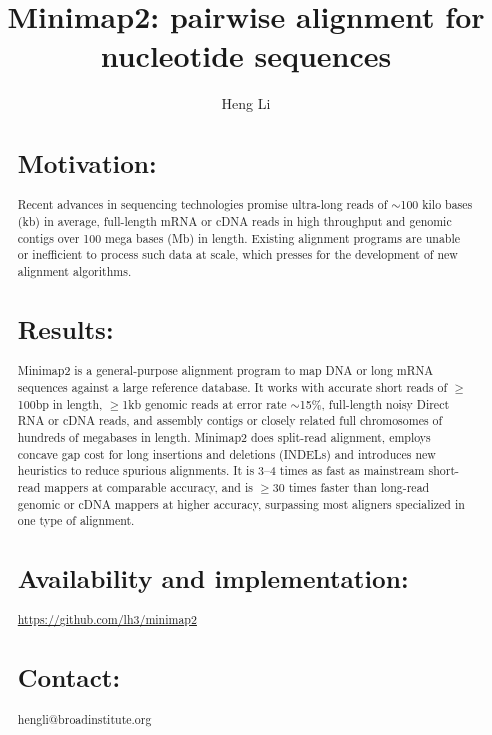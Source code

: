 \documentclass{bioinfo}
\begin{document}

\title[Aligning nucleotide sequences with minimap2]{Minimap2: pairwise alignment for nucleotide sequences}
\author[Li]{Heng Li}
\address{Broad Institute, 415 Main Street, Cambridge, MA 02142, USA}

\maketitle

\begin{abstract}

\section{Motivation:} Recent advances in sequencing technologies promise
ultra-long reads of $\sim$100 kilo bases (kb) in average, full-length mRNA or
cDNA reads in high throughput and genomic contigs over 100 mega bases (Mb) in
length. Existing alignment programs are unable or inefficient to process such data
at scale, which presses for the development of new alignment algorithms.

\section{Results:} Minimap2 is a general-purpose alignment program to map DNA or long
mRNA sequences against a large reference database. It works with accurate short
reads of $\ge$100bp in length, $\ge$1kb genomic reads at error rate $\sim$15\%,
full-length noisy Direct RNA or cDNA reads, and assembly contigs or closely
related full chromosomes of hundreds of megabases in length. Minimap2 does
split-read alignment, employs concave gap cost for long insertions and
deletions (INDELs) and introduces new heuristics to reduce spurious alignments.
It is 3--4 times as fast as mainstream short-read mappers at comparable
accuracy, and is $\ge$30 times faster than long-read genomic or cDNA
mappers at higher accuracy, surpassing most aligners specialized in one type of
alignment.

\section{Availability and implementation:}
\href{https://github.com/lh3/minimap2}{https://github.com/lh3/minimap2}

\section{Contact:} hengli@broadinstitute.org
\end{abstract}
\end{document}
